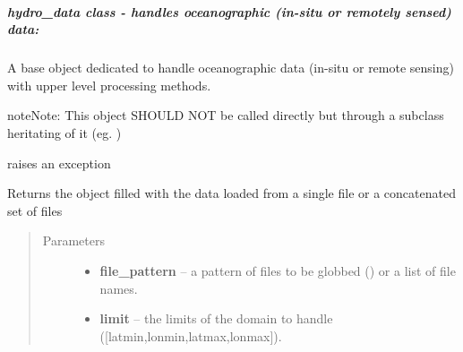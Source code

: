 \documentclass[letterpaper,10pt,english]{sphinxmanual}
\begin{document}
\subparagraph{hydro\_data class - handles oceanographic (in-situ or remotely sensed) data:}
\label{altimetry.data:hydro-data-class-handles-oceanographic-in-situ-or-remotely-sensed-data}\label{altimetry.data:hydro-data}

\begin{fulllineitems}
\label{altimetry.data:altimetry.data.hydro_data}
A base object dedicated to handle oceanographic data (in-situ or remote sensing) with upper level processing methods.

\begin{notice}{note}{Note:}
This object SHOULD NOT be called directly but through a subclass heritating of it (eg. {\hyperref[altimetry.data:altimetry.data.alti_data]{}})
\end{notice}

\begin{fulllineitems}
\label{altimetry.data:altimetry.data.hydro_data.Error}
raises an exception

\end{fulllineitems}


\begin{fulllineitems}
\label{altimetry.data:altimetry.data.hydro_data.__init__}
Returns the object filled with the data loaded from a single file or a concatenated set of files
\begin{quote}\begin{description}
\item[{Parameters}] \leavevmode\begin{itemize}
\item {} 
\textbf{file\_pattern} -- a pattern of files to be globbed (\href{http://docs.python.org/library/glob.html\#glob.glob}{}) or a list of file names.

\item {} 
\textbf{limit} -- the limits of the domain to handle ({[}latmin,lonmin,latmax,lonmax{]}).


\end{itemize}
\end{description}
\end{quote}
\end{fulllineitems}
\end{fulllineitems}
\end{document}
